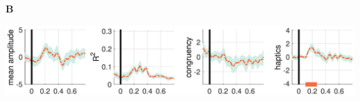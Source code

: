   \begin{minipage}[]{\textwidth}
    \begin{flushleft}\textbf{B}\end{flushleft}
    \includegraphics[width=\textwidth]{figures/erp_congruency_Pz.eps}
    \label{erp_Pz}
  \end{minipage}
  \label{erps}